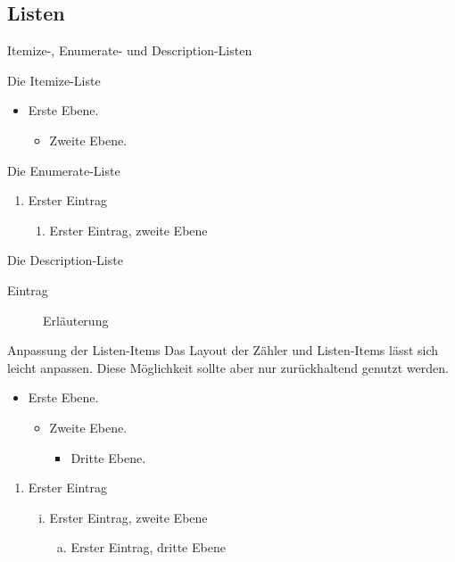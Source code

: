 \subsection{Listen}

\begin{frame}{Itemize-, Enumerate- und Description-Listen}

Die Itemize-Liste
    \begin{itemize}
      \item Erste Ebene.
       \begin{itemize}
        \item Zweite Ebene.
       \end{itemize}
    \end{itemize}

Die Enumerate-Liste
  \begin{enumerate}
   \item Erster Eintrag
    \begin{enumerate}
     \item Erster Eintrag, zweite Ebene
    \end{enumerate}
  \end{enumerate}

Die Description-Liste
  \begin{description}
  \item[Eintrag] Erläuterung
  \end{description}

\end{frame}

\begin{frame}{Anpassung der Listen-Items}
Das Layout der Zähler und Listen-Items lässt sich leicht anpassen. Diese
Möglichkeit sollte aber nur zurückhaltend genutzt werden.


\begin{itemize}
   \item Erste Ebene.
       \begin{itemize}
        \item Zweite Ebene.
       \begin{itemize}
        \item Dritte Ebene.
       \end{itemize}
       \end{itemize}
\end{itemize}
\begin{enumerate}[1.]
  \item Erster Eintrag
  \begin{enumerate}[(i)]
  \item Erster Eintrag, zweite Ebene
  \begin{enumerate}[a)]
  \item Erster Eintrag, dritte Ebene
  \end{enumerate}
  \end{enumerate}
\end{enumerate}
\end{frame}

